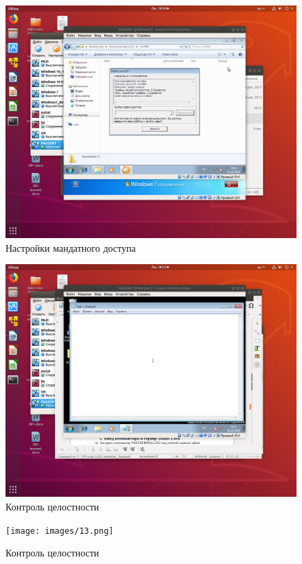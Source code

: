 \begin{figure}[H]
	\centering
	\includegraphics[width=.8\textwidth]{images/11.png}
	\caption{Настройки мандатного доступа}
\end{figure}

\begin{figure}[H]
	\centering
	\includegraphics[width=.8\textwidth]{images/12.png}
	\caption{Контроль целостности}
\end{figure}

\begin{figure}[H]
	\centering
	\texttt{[image: images/13.png]}
	\caption{Контроль целостности}
\end{figure}

